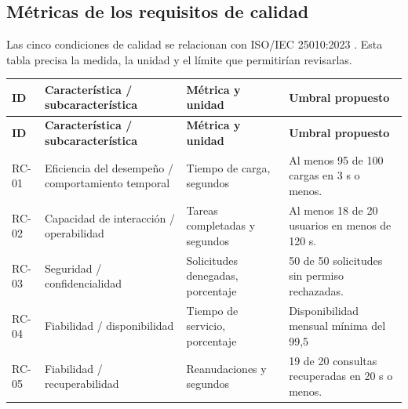 \documentclass[12pt,a4paper]{article}
\begin{document}
\subsection{Métricas de los requisitos de calidad}
Las cinco condiciones de calidad se relacionan con ISO/IEC 25010:2023 \cite{iso25010}. Esta tabla precisa la medida, la unidad y el límite que permitirían revisarlas.
\small
\begin{longtable}{@{}P{1.25cm}P{4.4cm}P{3.2cm}P{4.75cm}@{}}
\toprule
\textbf{ID} & \textbf{Característica / subcaracterística} & \textbf{Métrica y unidad} & \textbf{Umbral propuesto}\\\midrule
\endfirsthead
\toprule\textbf{ID} & \textbf{Característica / subcaracterística} & \textbf{Métrica y unidad} & \textbf{Umbral propuesto}\\\midrule
\endhead
RC-01 & Eficiencia del desempeño / comportamiento temporal & Tiempo de carga, segundos & Al menos 95 de 100 cargas en 3 s o menos.\\
RC-02 & Capacidad de interacción / operabilidad & Tareas completadas y segundos & Al menos 18 de 20 usuarios en menos de 120 s.\\
RC-03 & Seguridad / confidencialidad & Solicitudes denegadas, porcentaje & 50 de 50 solicitudes sin permiso rechazadas.\\
RC-04 & Fiabilidad / disponibilidad & Tiempo de servicio, porcentaje & Disponibilidad mensual mínima del 99,5\\%
RC-05 & Fiabilidad / recuperabilidad & Reanudaciones y segundos & 19 de 20 consultas recuperadas en 20 s o menos.\\
\bottomrule
\end{longtable}
\normalsize
\end{document}
